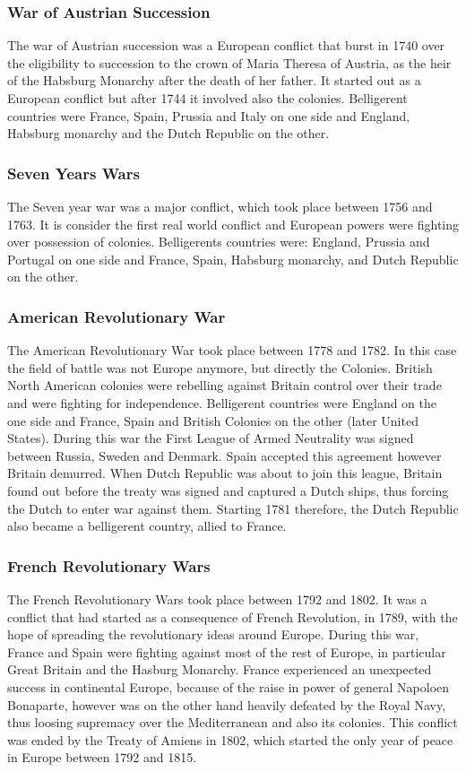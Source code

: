 \documentclass[12pt,a4paper,titlepage,english]{article}
\begin{document}
\subsubsection{War of Austrian Succession}
The war of Austrian succession was a European conflict that burst in 1740 over the eligibility to succession to the crown of Maria Theresa of Austria, as the heir of the Habsburg Monarchy after the death of her father. It started out as a European conflict but after 1744 it involved also the colonies. Belligerent countries were France, Spain, Prussia and Italy on one side and England, Habsburg monarchy and the Dutch Republic on the other. 

\subsubsection{Seven Years Wars}
The Seven year war was a major conflict, which took place between 1756 and 1763. It is consider the first real world conflict and European powers were fighting over possession of colonies. Belligerents countries were: England, Prussia and Portugal on one side and France, Spain, Habsburg monarchy, and Dutch Republic on the other. 

\subsubsection{American Revolutionary War}
The American Revolutionary War took place between 1778 and 1782. In this case the field of battle was not Europe anymore, but directly the Colonies. British North American colonies were rebelling against Britain control over their trade and were fighting for independence. Belligerent countries were England on the one side and France, Spain and British Colonies on the other (later United States). During this war the First League of Armed Neutrality was signed between Russia, Sweden and Denmark. Spain accepted this agreement however Britain demurred. When Dutch Republic was about to join this league, Britain found out before the treaty was signed and captured a Dutch ships, thus forcing the Dutch to enter war against them. Starting 1781 therefore, the Dutch Republic also became a belligerent country, allied to France. 

\subsubsection{French Revolutionary Wars}
The French Revolutionary Wars took place between 1792 and 1802. It was a conflict that had started as a consequence of French Revolution, in 1789, with the hope of spreading the revolutionary ideas around Europe. During this war, France and Spain were fighting against most of the rest of Europe, in particular Great Britain and the Hasburg Monarchy. France experienced an unexpected success in continental Europe, because of the raise in power of general Napoloen Bonaparte, however was on the other hand heavily defeated by the Royal Navy, thus loosing supremacy over the Mediterranean and also its colonies. This conflict was ended by the Treaty of Amiens in 1802, which started the only year of peace in Europe between 1792 and 1815.
\end{document}
